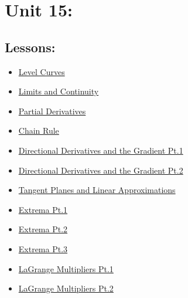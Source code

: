 \documentclass[9pt]{amsart}
\begin{document}
\section{Unit 15:}
    \subsection{Lessons:}
        \begin{itemize}
            \item \href{https://www.youtube.com/watch?v=jcgdm4dNoG0&list=PLVOT1I6lLvjfDhACPSMXam2diM0IBR3hl&index=8}{Level Curves}
            \item \href{https://www.youtube.com/watch?v=jcgdm4dNoG0&list=PLVOT1I6lLvjfDhACPSMXam2diM0IBR3hl&index=8}{Limits and Continuity}
            \item \href{https://www.youtube.com/watch?v=Lk0N24reXEk&list=PLVOT1I6lLvjfDhACPSMXam2diM0IBR3hl&index=10}{Partial Derivatives}
            \item \href{https://www.youtube.com/watch?v=yyJyuHEkPZ8&list=PLVOT1I6lLvjfDhACPSMXam2diM0IBR3hl&index=11}{Chain Rule}
            \item \href{https://www.youtube.com/watch?v=frE1UFRhflg&list=PLVOT1I6lLvjfDhACPSMXam2diM0IBR3hl&index=12}{Directional Derivatives and the Gradient Pt.1}
            \item \href{https://www.youtube.com/watch?v=nI_KvqSWHjo&list=PLVOT1I6lLvjfDhACPSMXam2diM0IBR3hl&index=13}{Directional Derivatives and the Gradient Pt.2}
            \item \href{https://www.youtube.com/watch?v=zrzbNsK3C8I&list=PLVOT1I6lLvjfDhACPSMXam2diM0IBR3hl&index=14}{Tangent Planes and Linear Approximations}
            \item \href{https://www.youtube.com/watch?v=Sfb5eUoG4Q0&list=PLVOT1I6lLvjfDhACPSMXam2diM0IBR3hl&index=15}{Extrema Pt.1}
            \item \href{https://www.youtube.com/watch?v=LSp-1lQ0lHI&list=PLVOT1I6lLvjfDhACPSMXam2diM0IBR3hl&index=16}{Extrema Pt.2}
            \item \href{https://www.youtube.com/watch?v=aAgkhoaggSM&list=PLVOT1I6lLvjfDhACPSMXam2diM0IBR3hl&index=17}{Extrema Pt.3}
            \item \href{https://www.youtube.com/watch?v=R2rQdQkG-i8&list=PLVOT1I6lLvjfDhACPSMXam2diM0IBR3hl&index=18}{LaGrange Multipliers Pt.1}
            \item \href{https://www.youtube.com/watch?v=XQlKolWjr14&list=PLVOT1I6lLvjfDhACPSMXam2diM0IBR3hl&index=19}{LaGrange Multipliers Pt.2}
        \end{itemize}
    
\end{document}
